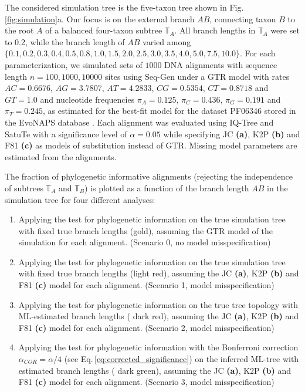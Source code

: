 \begin{appendices}
\noindent The considered simulation tree is the five-taxon tree shown in Fig.\,\ref{fig:simulation}a. Our focus is on the external branch $AB$, connecting taxon $B$ to the root $A$ of a balanced four-taxon subtree $\mathbb{T}_A$. All branch lengths in $\mathbb{T}_A$ were set to 0.2, while the branch length of $AB$ varied among $\{0.1, 0.2, 0.3, 0.4, 0.5, 0.8, 1.0, 1.5, 2.0, 2.5, 3.0, 3.5, 4.0, 5.0, 7.5, 10.0\}$. For each parameterization, we simulated sets of $1000$ DNA alignments with sequence length ${n = 100, 1000, 10000}$ sites using Seq-Gen  under a GTR model with rates $AC=0.6676$, $AG=3.7807$, $AT=4.2833$, $CG=0.5354$, $CT=0.8718$ and $GT=1.0$ and nucleotide frequencies $\pi_A = 0.125$, $\pi_C = 0.436$, $\pi_G = 0.191$ and $\pi_T =0.245$, as estimated for the best-fit model for the dataset PF06346 stored in the EvoNAPS database . Each alignment was evaluated using IQ-Tree  and SatuTe with a significance level of $\alpha = 0.05$ while specifying JC \textbf{(a)}, K2P \textbf{(b)} and F81 \textbf{(c)} as models of substitution instead of GTR. Missing model parameters are estimated from the alignments.


\medskip
The fraction of phylogenetic informative alignments (rejecting the independence of subtrees $\mathbb{T}_A$ and $\mathbb{T}_B$) is plotted as a function of the branch length $AB$ in the simulation tree for four different analyses:

\medskip

\begin{enumerate}
\item  Applying the test for phylogenetic information on the true simulation tree with fixed true branch lengths ({\color{truetreeNoMisspecification}gold}), assuming the GTR model of the simulation for each alignment. (Scenario 0, no model misspecification)
\item Applying the test for phylogenetic information on the true simulation tree with fixed true branch lengths ({\color{truetree}light red}), assuming the JC \textbf{(a)}, K2P \textbf{(b)} and F81 \textbf{(c)} model for each alignment. (Scenario 1, model misspecification)
\item Applying the test for phylogenetic information on the true tree topology with ML-estimated branch lengths ({\color{truetreeML} dark red}), assuming the JC \textbf{(a)}, K2P \textbf{(b)} and F81 \textbf{(c)} model for each alignment. (Scenario 2, model misspecification)
\item Applying the test for phylogenetic information with the  Bonferroni correction $\alpha_{COR} = \alpha/4$ (see Eq.\,\eqref{eq:corrected_significance}) on the inferred ML-tree with estimated branch lengths ({\color{MLtreeBonferroni} dark green}), assuming the JC \textbf{(a)}, K2P \textbf{(b)} and F81 \textbf{(c)}  model for each alignment. (Scenario 3, model misspecification) 
\end{enumerate}


\end{appendices}
